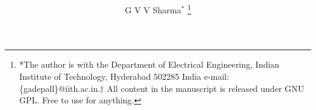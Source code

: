 \documentclass[journal,12pt,twocolumn]{IEEEtran}
\begin{document}

\def\putbox#1#2#3{\makebox[0in][l]{\makebox[#1][l]{}\raisebox{\baselineskip}[0in][0in]{\raisebox{#2}[0in][0in]{#3}}}}
     \def\rightbox#1{\makebox[0in][r]{#1}}
     \def\centbox#1{\makebox[0in]{#1}}
     \def\topbox#1{\raisebox{-\baselineskip}[0in][0in]{#1}}
     \def\midbox#1{\raisebox{-0.5\baselineskip}[0in][0in]{#1}}

\vspace{3cm}

\title{ 
}


%
%
%

\author{ G V V Sharma$^{*}$ %
\thanks{*The author is with the Department
of Electrical Engineering, Indian Institute of Technology, Hyderabad
502285 India e-mail:  \{gadepall\}@iith.ac.in.$\dagger$  All content in the manuscript is released under GNU GPL.  Free to use for anything. }%
}
% 
%
\end{document}
